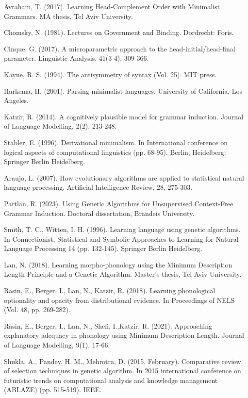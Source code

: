 \documentclass{article}
\begin{document}
\begin{thebibliography}{} %

Avraham, T. (2017). 
Learning Head-Complement Order with Minimalist Grammars.
MA thesis, Tel Aviv University.

Chomsky, N. (1981). 
Lectures on Government and Binding.
Dordrecht: Foris.

Cinque, G. (2017). 
A microparametric approach to the head-initial/head-final parameter. 
Linguistic Analysis, 41(3-4), 309-366.

Kayne, R. S. (1994). 
The antisymmetry of syntax (Vol. 25). 
MIT press.

Harkema, H. (2001). 
Parsing minimalist languages. 
University of California, Los Angeles.

Katzir, R. (2014). 
A cognitively plausible model for grammar induction. 
Journal of Language Modelling, 2(2), 213-248.

Stabler, E. (1996). 
Derivational minimalism. In International conference on logical aspects of computational linguistics (pp. 68-95). 
Berlin, Heidelberg: Springer Berlin Heidelberg.

Araujo, L. (2007). 
How evolutionary algorithms are applied to statistical natural language processing. 
Artificial Intelligence Review, 28, 275-303.

Partlan, R. (2023). 
Using Genetic Algorithms for Unsupervised Context-Free Grammar Induction.
Doctoral dissertation, Brandeis University.

Smith, T. C.,  Witten, I. H. (1996). 
Learning language using genetic algorithms. 
In Connectionist, Statistical and Symbolic Approaches to Learning for Natural Language Processing 14 (pp. 132-145). Springer Berlin Heidelberg.

Lan, N. (2018). 
Learning morpho-phonology using the Minimum Description Length Principle and a Genetic Algorithm.
Master’s thesis, Tel Aviv University.

Rasin, E., Berger, I., Lan, N.,  Katzir, R. (2018). 
Learning phonological optionality and opacity from distributional evidence. 
In Proceedings of NELS (Vol. 48, pp. 269-282).

Rasin, E., Berger, I., Lan, N., Shefi, I.,Katzir, R. (2021). 
Approaching explanatory adequacy in phonology using Minimum Description Length. 
Journal of Language Modelling, 9(1), 17-66.

Shukla, A., Pandey, H. M., Mehrotra, D. (2015, February). 
Comparative review of selection techniques in genetic algorithm. 
In 2015 international conference on futuristic trends on computational analysis and knowledge management (ABLAZE) (pp. 515-519). IEEE.


\end{thebibliography}
\end{document}
